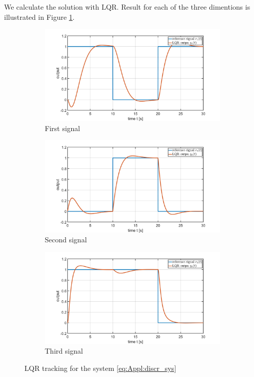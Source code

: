 \begin{exam}
We calculate the solution with LQR. Result for each of the three dimentions is illustrated in Figure \ref{img:Appl:AC1_LQR}. 
\begin{figure}[H]
	\centering
	\begin{subfigure}[b]{0.3\textwidth}
		\centering
		\includegraphics[width=\textwidth]{fig/AC1_LQR_1.jpg}
		\caption{First signal}
	\end{subfigure}
	\hfill
	\begin{subfigure}[b]{0.3\textwidth}
		\centering
		\includegraphics[width=\textwidth]{fig/AC1_LQR_2.jpg}
		\caption{Second signal}
	\end{subfigure}
	\hfill
	\begin{subfigure}[b]{0.3\textwidth}
		\centering
		\includegraphics[width=\textwidth]{fig/AC1_LQR_3.jpg}
		\caption{Third signal}
	\end{subfigure}
	\caption{LQR tracking for the system \eqref{eq:Appl:discr_sys}}
	\label{img:Appl:AC1_LQR}
\end{figure}


\end{exam}
